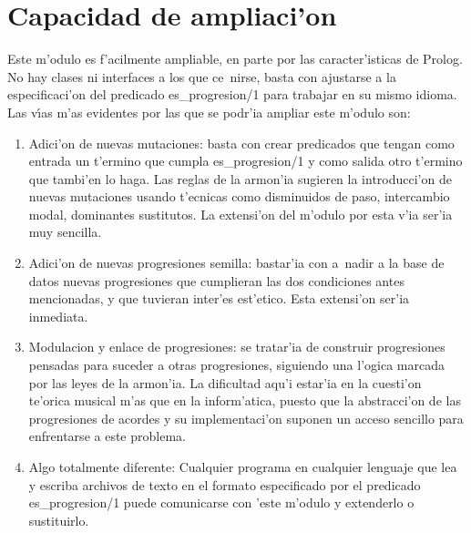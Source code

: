 \section {Capacidad de ampliaci'on}
Este m'odulo es f'acilmente ampliable, en parte por las caracter'isticas de Prolog. No hay clases ni interfaces a los que ce~nirse, basta con ajustarse a la especificaci'on del predicado es\_progresion/1 para trabajar en su mismo idioma. Las v\'\i as m'as evidentes por las que se podr'ia ampliar este m'odulo son:
        \begin{enumerate}
        \item Adici'on de nuevas mutaciones: basta con crear predicados que tengan como entrada un t'ermino que cumpla es\_progresion/1 y como salida otro t'ermino que tambi'en lo haga. Las reglas de la armon'ia sugieren la introducci'on de nuevas mutaciones usando t'ecnicas como disminuidos de paso, intercambio modal, dominantes sustitutos. La extensi'on del m'odulo por esta v'ia ser'ia muy sencilla.
        \item Adici'on de nuevas progresiones semilla: bastar'ia con a~nadir a la base de datos nuevas progresiones que cumplieran las dos condiciones antes mencionadas, y que tuvieran inter'es est'etico. Esta extensi'on ser'ia inmediata.
        \item Modulacion y enlace de progresiones: se tratar'ia de construir progresiones pensadas para suceder a otras progresiones, siguiendo una l'ogica marcada por las leyes de la armon'ia. La dificultad aqu'i estar'ia en la cuesti'on te'orica musical m'as que en la inform'atica, puesto que la abstracci'on de las progresiones de acordes y su implementaci'on suponen un acceso sencillo para enfrentarse a este problema.
        \item Algo totalmente diferente: Cualquier programa en cualquier lenguaje que lea y escriba archivos de texto en el formato especificado por el predicado es\_progresion/1 puede comunicarse con 'este m'odulo y extenderlo o sustituirlo.
        \end{enumerate}
